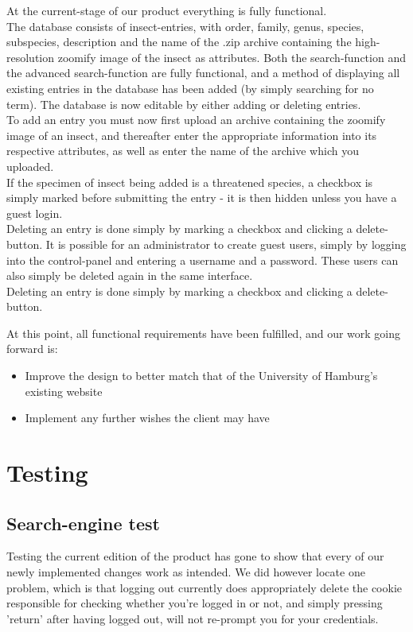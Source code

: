 \documentclass[12pt,a4paper]{article}
\begin{document}
At the current-stage of our product everything is fully functional.\\
The database consists of insect-entries, with order, family, genus, species, subspecies, description and the name of the .zip archive containing the high-resolution zoomify image of the insect as attributes.
Both the search-function and the advanced search-function are fully functional, and a method of displaying all existing entries in the database has been added (by simply searching for no term).
The database is now editable by either adding or deleting entries.\\
To add an entry you must now first upload an archive containing the zoomify image of an insect, and thereafter enter the appropriate information into its respective attributes, as well as enter the name of the archive which you uploaded.\\
If the specimen of insect being added is a threatened species, a checkbox is simply marked before submitting the entry - it is then hidden unless you have a guest login.\\
Deleting an entry is done simply by marking a checkbox and clicking a delete-button.
It is possible for an administrator to create guest users, simply by logging into the control-panel and entering a username and a password. These users can also simply be deleted again in the same interface.\\
Deleting an entry is done simply by marking a checkbox and clicking a delete-button.

At this point, all functional requirements have been fulfilled, and our work going forward is:
\begin{itemize}
\item Improve the design to better match that of the University of Hamburg's existing website
\item Implement any further wishes the client may have
\end{itemize}
\newpage
\section{Testing}
\subsection{Search-engine test}

Testing the current edition of the product has gone to show that every of our newly implemented changes work as intended. We did however locate one problem, which is that logging out currently does appropriately delete the cookie responsible for checking whether you're logged in or not, and simply pressing 'return' after having logged out, will not re-prompt you for your credentials.
\end{document}
